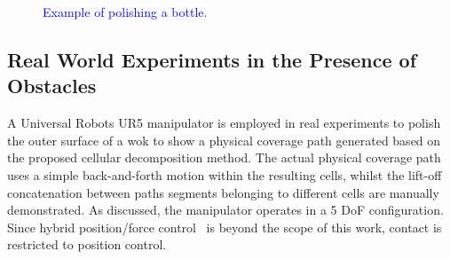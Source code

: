 \documentclass[journal]{IEEEtran}
\begin{document}
\begin{figure}[t]
\centering
{}
\caption{\textcolor{blue}{Example of polishing a bottle.}
}
\label{fig:object1_sim}
\end{figure}

\subsection{Real World Experiments in the Presence of Obstacles}
\label{sec:real_examples}

A Universal Robots UR5 manipulator is employed in real experiments to polish the outer surface of a wok to show a physical coverage path generated based on the proposed cellular decomposition method. 
The actual physical coverage path uses a simple back-and-forth motion within the resulting cells, whilst the lift-off concatenation between paths segments belonging to different cells are manually demonstrated. 
As discussed, the manipulator operates in a 5 DoF configuration. 
Since hybrid position/force control~\cite{solanes2019robust} is beyond the scope of this work, contact is restricted to position control. 
\end{document}

